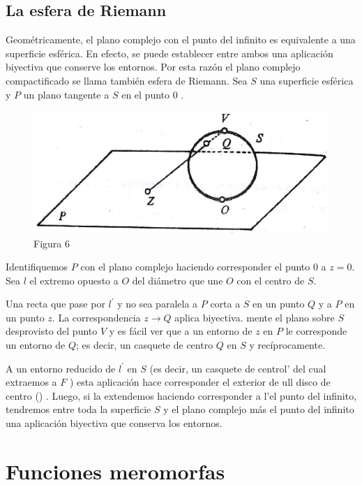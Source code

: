 \documentclass[10pt]{article}
\theoremstyle{plain}
\theoremstyle{definition}
\theoremstyle{remark}
\begin{document}
\subsection*{La esfera de Riemann}
Geométricamente, el plano complejo con el punto del infinito es equivalente a una superficie esférica. En efecto, se puede establecer entre ambos una aplicación biyectiva que conserve los entornos. Por esta razón el plano complejo compactificado se llama también esfera de Riemann. Sea $S$ una superficie esférica y $P$ un plano tangente a $S$ en el punto 0 .

\begin{figure}[h]
\begin{center}
  \includegraphics[width=\textwidth]{2025_09_05_adecef5eb2053bc129b5g-085}
\captionsetup{labelformat=empty}
\caption{Figura 6}
\end{center}
\end{figure}

Identifiquemos $P$ con el plano complejo haciendo corresponder el punto 0 a $z=0$. Sea $l$ el extremo opuesto a $O$ del diámetro que une $O$ con el centro de $S$.

Una recta que pase por $l^{\prime}$ y no sea paralela a $P$ corta a $S$ en un punto $Q$ y a $P$ en un punto $z$. La correspondencia $z \rightarrow Q$ aplica biyectiva. mente el plano sobre $S$ desprovisto del punto $V$ y es fácil ver que a un entorno de $z$ en $P$ le corresponde un entorno de $Q$; es decir, un casquete de centro $Q$ en $S$ y recíprocamente.

A un entorno reducido de $l^{\prime}$ en $S$ (es decir, un casquete de centrol' del cual extraemos a $F$ ) esta aplicación hace corresponder el exterior de ull disco de centro () . Luego, si la extendemos haciendo corresponder a l'el punto del infinito, tendremos entre toda la superficie $S$ y el plano complejo más el punto del infinito una aplicación biyectiva que conserva los entornos.

\section{Funciones meromorfas}
\end{document}
